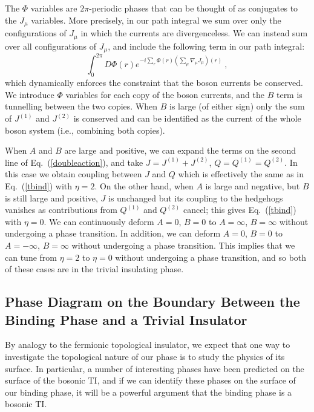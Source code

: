 The $\Phi$ variables are $2\pi$-periodic phases that can be thought of as conjugates to the $J_\mu$ variables. More precisely, in our path integral we sum over only the configurations of $J_\mu$ in which the currents are divergenceless. We can instead sum over all configurations of $J_\mu$, and include the following term in our path integral:
\begin{equation}
\int_0^{2\pi} D\Phi(r) e^{-i\sum_r \Phi(r)(\sum_\mu\nabla_\mu J_\mu)(r)} ~,
\end{equation}
which dynamically enforces the constraint that the boson currents be conserved. We introduce $\Phi$ variables for each copy of the boson currents, and the $B$ term is tunnelling between the two copies. 
When $B$ is large (of either sign) only the sum of $J^{(1)}$ and $J^{(2)}$ is conserved and can be identified as the current of the whole boson system (i.e., combining both copies).

When $A$ and $B$ are large and positive, we can expand the terms on the second line of Eq.~(\ref{doubleaction}), and take $J = J^{(1)} + J^{(2)}$, $Q = Q^{(1)} = Q^{(2)}$. In this case we obtain coupling between $J$ and $Q$ which is effectively the same as in Eq.~(\ref{tbind}) with $\eta=2$. 
On the other hand, when $A$ is large and negative, but $B$ is still large and positive, $J$ is unchanged but its coupling to the hedgehogs vanishes as contributions from $Q^{(1)}$ and $Q^{(2)}$ cancel; this gives Eq.~(\ref{tbind}) with $\eta=0$.
We can continuously deform $A=0$, $B=0$ to $A=\infty$, $B=\infty$ without undergoing a phase transition. In addition, we can deform $A=0$, $B=0$ to $A=-\infty$, $B=\infty$ without undergoing a phase transition. This implies that we can tune from $\eta=2$ to $\eta=0$ without undergoing a phase transition, and so both of these cases are in the trivial insulating phase.


\subsection{Phase Diagram on the Boundary Between the Binding Phase and a Trivial Insulator}
\label{subsec:heissurf}
By analogy to the fermionic topological insulator, we expect that one way to investigate the topological nature of our phase is to study the physics of its surface. In particular, a number of interesting phases have been predicted on the surface of the bosonic TI,\cite{SenthilVishwanath} and if we can identify these phases on the surface of our binding phase, it will be a powerful argument that the binding phase is a bosonic TI.

